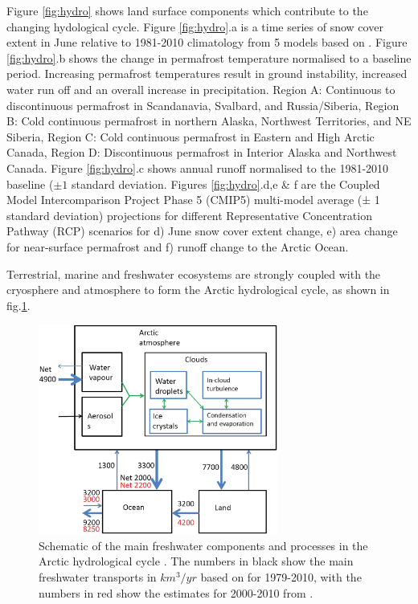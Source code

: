 \documentclass[12pt, oneside]{article}
\begin{document}
Figure \ref{fig:hydro} shows land surface components which contribute to the changing hydological cycle. Figure \ref{fig:hydro}.a is a time series of snow cover extent in June relative to 1981-2010 climatology from 5 models based on . Figure \ref{fig:hydro}.b shows the change in permafrost temperature normalised to a baseline period. Increasing permafrost temperatures result in ground instability, increased water run off and an overall increase in precipitation. Region A: Continuous to discontinuous permafrost in Scandanavia, Svalbard, and Russia/Siberia, Region B: Cold continuous permafrost in northern Alaska, Northwest Territories, and NE Siberia, Region C: Cold continuous permafrost in Eastern and High Arctic Canada, Region D: Discontinuous permafrost in Interior Alaska and Northwest Canada. Figure \ref{fig:hydro}.c shows annual runoff normalised to the 1981-2010 baseline ($\pm 1$ standard deviation. Figures \ref{fig:hydro}.d,e \& f are the Coupled Model Intercomparison Project Phase 5 (CMIP5) multi-model average (± 1 standard deviation) projections for different Representative Concentration Pathway (RCP) scenarios for d) June snow cover extent change, e) area change for near-surface permafrost and f) runoff change to the Arctic Ocean. 

Terrestrial, marine and freshwater ecosystems are strongly coupled with the cryosphere and atmosphere to form the Arctic hydrological cycle, as shown in fig.\ref{fig:hydro_cycle}.  


\begin{figure}[h!]
\centering
\includegraphics[width=0.7\textwidth]{figures/hydological_cycle.png}
\caption{Schematic of the main freshwater components and processes in the Arctic hydrological cycle \cite{vihma2016atmospheric}. The numbers in black show the main freshwater transports in $km^3/yr$ based on \cite{serreze2006large} for 1979-2010, with the numbers in red show the estimates for 2000-2010 from   \cite{haine2015arctic}. }\label{fig:hydro_cycle}
\end{figure}
\end{document}
